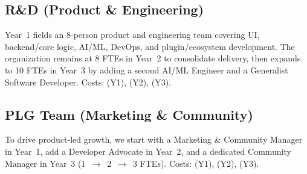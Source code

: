 \subsection{R\&D (Product \& Engineering)}
Year~1 fields an 8-person product and engineering team covering UI, backend/core logic, AI/ML, DevOps, and plugin/ecosystem development. The organization remains at 8 FTEs in Year~2 to consolidate delivery, then expands to 10 FTEs in Year~3 by adding a second AI/ML Engineer and a Generalist Software Developer. Costs: \textbf{} (Y1), \textbf{} (Y2), \textbf{} (Y3).

\subsection{PLG Team (Marketing \& Community)}
To drive product-led growth, we start with a Marketing \& Community Manager in Year~1, add a Developer Advocate in Year~2, and a dedicated Community Manager in Year~3 (1~$\rightarrow$~2~$\rightarrow$~3 FTEs). Costs: \textbf{} (Y1), \textbf{} (Y2), \textbf{} (Y3).

